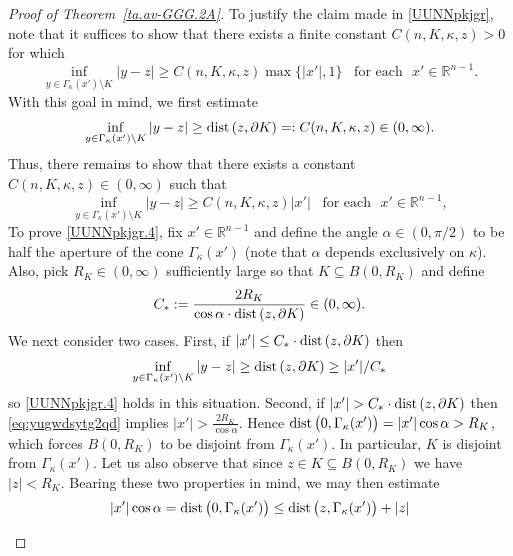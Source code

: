 \documentclass[11pt,reqno]{amsart}
\numberwithin{equation}{section}
\theoremstyle{remark}
\begin{document}
\begin{proof}[Proof of Theorem~\ref{ta.av-GGG.2A}]
To justify the claim made in \eqref{UUNNpkjgr}, note that it suffices to show that there exists a finite constant 
$C(n,K,\kappa,z)>0$ for which 
%
\begin{equation}\label{UUNNpkjgr.2}
\inf_{y\in\Gamma_\kappa(x')\setminus K}|y-z|\geq C(n,K,\kappa,z)
\max\big\{|x'|,1\big\}\,\,\,\text{ for each }\,\,x'\in{\mathbb{R}}^{n-1}.
\end{equation}
%
With this goal in mind, we first estimate 
%
\begin{equation}\label{UUNNpkjgr.3}
\inf_{y\in\Gamma_\kappa(x')\setminus K}|y-z|\geq{\rm dist}\,(z,\partial K)=:C(n,K,\kappa,z)\in(0,\infty).
\end{equation}
%
Thus, there remains to show that there exists a constant $C(n,K,\kappa,z)\in(0,\infty)$ such that 
%
\begin{equation}\label{UUNNpkjgr.4}
\inf_{y\in\Gamma_\kappa(x')\setminus K}|y-z|\geq C(n,K,\kappa,z)|x'|\,\,\,\text{ for each }\,\,x'\in{\mathbb{R}}^{n-1},
\end{equation}
%
To prove \eqref{UUNNpkjgr.4}, fix $x'\in{\mathbb{R}}^{n-1}$ and 
define the angle $\alpha\in(0,\pi/2)$ to be half the aperture of the cone 
$\Gamma_\kappa(x')$ (note that $\alpha$ depends exclusively on $\kappa$). 
Also, pick $R_K\in(0,\infty)$ sufficiently large so that $K\subseteq B(0,R_K)$ and define 
%
\begin{equation}\label{eq:yugwdsytg2qd}
C_\ast:=\frac{2R_K}{\cos\alpha\cdot{\rm dist}\,(z,\partial K)}\in(0,\infty).
\end{equation}
%
We next consider two cases. First, if $|x'|\leq C_\ast\cdot{\rm dist}\,(z,\partial K)$ then 
%
\begin{equation}\label{UUNNpkjgr.3hbs}
\inf_{y\in\Gamma_\kappa(x')\setminus K}|y-z|\geq{\rm dist}\,(z,\partial K)\geq|x'|/C_\ast
\end{equation}
%
so \eqref{UUNNpkjgr.4} holds in this situation. Second, if $|x'|>C_\ast\cdot{\rm dist}\,(z,\partial K)$ then 
\eqref{eq:yugwdsytg2qd} implies $|x'|>\frac{2R_K}{\cos\alpha}$. Hence ${\rm dist}\,\big(0,\Gamma_\kappa(x')\big)=|x'|\cos\alpha>R_K$, 
which forces $B(0,R_K)$ to be disjoint from $\Gamma_\kappa(x')$. In particular, $K$ is disjoint from $\Gamma_\kappa(x')$. 
Let us also observe that since $z\in K\subseteq B(0,R_K)$ we have $|z|<R_K$. Bearing these two properties in mind, we may then estimate 
%
\begin{align}\label{eq:YYFUaytagNb7}
|x'|\cos\alpha &={\rm dist}\,\big(0,\Gamma_\kappa(x')\big)\leq
{\rm dist}\,\big(z,\Gamma_\kappa(x')\big)+|z|
\nonumber\\[4pt]

\end{align}
\end{proof}
\end{document}
